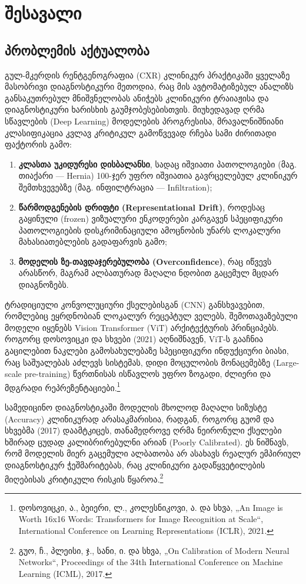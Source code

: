 \documentclass[12pt,a4paper,oneside]{report}
\begin{document}
\chapter{შესავალი}

\section{პრობლემის აქტუალობა}
გულ-მკერდის რენტგენოგრაფია (CXR) კლინიკურ პრაქტიკაში ყველაზე მასობრივი დიაგნოსტიკური მეთოდია, რაც მის ავტომატიზებულ ანალიზს განსაკუთრებულ მნიშვნელობას ანიჭებს კლინიკური ტრაიაჟისა და დიაგნოსტიკური ხარისხის გაუმჯობესებისთვის. მიუხედავად ღრმა სწავლების (Deep Learning) მოდელების პროგრესისა, მრავალნიშნიანი კლასიფიკაცია კვლავ კრიტიკულ გამოწვევად რჩება სამი ძირითადი ფაქტორის გამო: 
\begin{enumerate}[leftmargin=1.6em]
    \item \textbf{კლასთა უკიდურესი დისბალანსი}, სადაც იშვიათი პათოლოგიები (მაგ. თიაქარი — Hernia) 100-ჯერ უფრო იშვიათია გავრცელებულ კლინიკურ შემთხვევებზე (მაგ. ინფილტრაცია — Infiltration);
    \item \textbf{წარმოდგენების დრიფტი (Representational Drift)}, როდესაც გაყინული (frozen) ვიზუალური ენკოდერები კარგავენ სპეციფიკური პათოლოგიების დისკრიმინაციული ამოცნობის უნარს ლოკალური მახასიათებლების გადაფარვის გამო;
    \item \textbf{მოდელის ზე-თავდაჯერებულობა (Overconfidence)}, რაც იწვევს არასწორ, მაგრამ ალბათურად მაღალი ნდობით გაცემულ მცდარ დიაგნოზებს.
\end{enumerate}

ტრადიციული კონვოლუციური ქსელებისგან (CNN) განსხვავებით, რომლებიც ეყრდნობიან ლოკალურ რეცეპტულ ველებს, შემოთავაზებული მოდელი იყენებს Vision Transformer (ViT) არქიტექტურის პრინციპებს. როგორც დოსოვიცკი და სხვები (2021) აღნიშნავენ, ViT-ს გააჩნია გაცილებით ნაკლები გამოსახულებაზე სპეციფიკური ინდუქციური ბიასი, რაც საშუალებას აძლევს სისტემას, დიდი მოცულობის მონაცემებზე (Large-scale pre-training) წვრთნისას ისწავლოს უფრო ზოგადი, ძლიერი და მდგრადი რეპრეზენტაციები.\footnote{დოსოვიცკი, ა., ბეიერი, ლ., კოლესნიკოვი, ა. და სხვა, „An Image is Worth 16x16 Words: Transformers for Image Recognition at Scale“, International Conference on Learning Representations (ICLR), 2021.}

სამედიცინო დიაგნოსტიკაში მოდელის მხოლოდ მაღალი სიზუსტე (Accuracy) კლინიკურად არასაკმარისია, რადგან, როგორც გუომ და სხვებმა (2017) დაამტკიცეს, თანამედროვე ღრმა ნეირონული ქსელები ხშირად ცუდად კალიბრირებულნი არიან (Poorly Calibrated). ეს ნიშნავს, რომ მოდელის მიერ გაცემული ალბათობა არ ასახავს რეალურ ემპირიულ დიაგნოსტიკურ ჭეშმარიტებას, რაც კლინიკური გადაწყვეტილების მიღებისას კრიტიკული რისკის წყაროა.\footnote{გუო, ჩ., პლეისი, ჯ., სანი, ი. და სხვა, „On Calibration of Modern Neural Networks“, Proceedings of the 34th International Conference on Machine Learning (ICML), 2017.}
\end{document}
